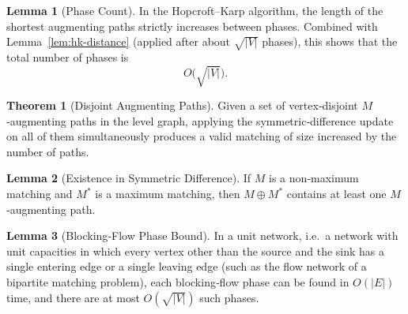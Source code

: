 \documentclass{article}
\theoremstyle{definition}
\newtheorem{theorem}{Theorem}
\newtheorem{lemma}{Lemma}
\begin{document}
\begin{lemma}[Phase Count]
\label{lem:hk-phases}
In the Hopcroft–Karp algorithm, the length of the shortest augmenting paths strictly increases between phases. Combined with Lemma~\ref{lem:hk-distance} (applied after about $\sqrt{|V|}$ phases), this shows that the total number of phases is
\[
O\bigl(\sqrt{|V|}\bigr).
\]
\end{lemma}

\begin{theorem}[Disjoint Augmenting Paths]
Given a set of vertex‐disjoint $M$‐augmenting paths in the level graph, applying the symmetric‐difference update on all of them simultaneously produces a valid matching of size increased by the number of paths.
\end{theorem}

\begin{lemma}[Existence in Symmetric Difference]
If $M$ is a non‐maximum matching and $M^*$ is a maximum matching, then $M \oplus M^*$ contains at least one $M$‐augmenting path.
\end{lemma}


\begin{lemma}[Blocking‐Flow Phase Bound]
In a unit network, i.e.\ a network with unit capacities in which every vertex other than the source and the sink has a single entering edge or a single leaving edge (such as the flow network of a bipartite matching problem), each blocking‐flow phase can be found in $O(|E|)$ time, and there are at most $O(\sqrt{|V|})$ such phases.
\end{lemma}
\end{document}
